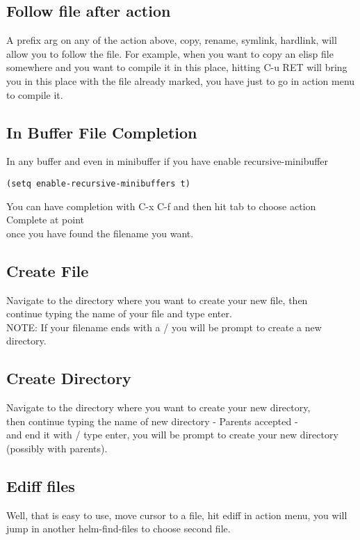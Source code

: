 \documentclass[a4paper,11pt]{article}
\begin{document}
\subsection{Follow file after action}
\label{sec:follow-file-after}
A prefix arg on any of the action above, copy, rename, symlink, hardlink, will
allow you to follow the file.
For example, when you want to copy an elisp file somewhere and you want to compile it in this place,
hitting C-u RET will bring you in this place with the file already marked, you have just to go in action menu to
compile it.  

\subsection{In Buffer File Completion}
\label{sec:buff-file-compl}
In any buffer and even in minibuffer if you have enable recursive-minibuffer
\begin{verbatim}
(setq enable-recursive-minibuffers t)
\end{verbatim}
You can have completion with C-x C-f and then hit tab to choose action Complete at point \\ 
once you have found the filename you want.
\subsection{Create File}
\label{sec:create-file}
Navigate to the directory where you want to create your new file, then \\
continue typing the name of your file and type enter. \\
NOTE: If your filename ends with a / you will be prompt to create a new directory.

\subsection{Create Directory}
\label{sec:create-directory}
Navigate to the directory where you want to create your new directory, \\
then continue typing the name of new directory - Parents accepted - \\
and end it with / type enter, you will be prompt to create your new directory (possibly with parents).

\subsection{Ediff files}
\label{sec:ediff-files}
Well, that is easy to use, 
move cursor to a file, hit ediff in action menu, you will jump in
another helm-find-files to choose second file.
\end{document}
